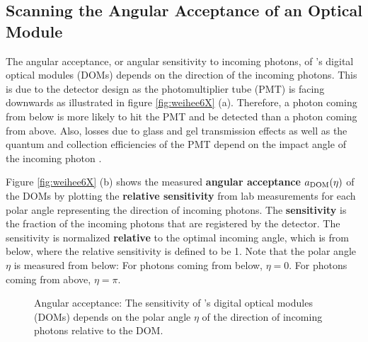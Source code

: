 \subsection{Scanning the Angular Acceptance of an Optical Module}
\label{sec:angular_acceptance_scan}

The angular acceptance, or angular sensitivity to incoming photons, of
\icecube's digital optical modules (DOMs) depends on the direction of
the incoming photons. This is due to the detector design as the
photomultiplier tube (PMT) is facing downwards as illustrated in figure
\ref{fig:weihee6X} (a). Therefore, a photon coming from below is more
likely to hit the PMT and be detected than a photon coming from above.
Also, losses due to glass and gel transmission effects as well as the
quantum and collection efficiencies of the PMT depend on the impact
angle of the incoming photon \cite{icepaper}.

Figure \ref{fig:weihee6X} (b) shows the measured
\textbf{angular acceptance} \(a_\text{DOM}(\eta)\) of the \icecube DOMs by
plotting the \textbf{relative sensitivity} from lab measurements for
each polar angle representing the direction of incoming photons.
\cite{icepaper} The \textbf{sensitivity} is the fraction of the incoming
photons that are registered by the detector. The sensitivity is
normalized \textbf{relative} to the optimal incoming angle, which is
from below, where the relative sensitivity is defined to be 1. Note that
the polar angle \(\eta\) is measured from below: For photons coming from
below, \(\eta = 0\). For photons coming from above, \(\eta = \pi\).

\begin{figure}[htbp]
  \hfill
  \caption{Angular acceptance: The sensitivity of \icecube's digital optical modules (DOMs) depends on the polar angle $\eta$ of the direction of incoming photons relative to the DOM.}
  \label{fig:weihee6X}\label{fig:icepaper}
\end{figure}

